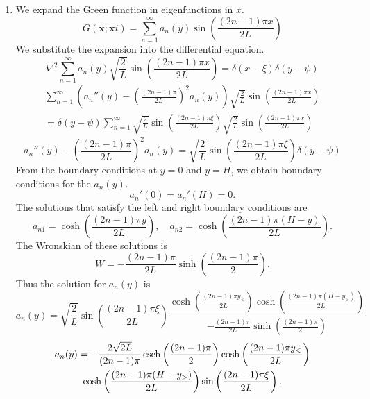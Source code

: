 {%
\begin{Solution}
  \begin{enumerate}
  \item
    We expand the Green function in eigenfunctions in $x$.
    \[
    G(\mathbf{x}; \mathbf{x}i) = \sum_{n = 1}^\infty a_n(y) 
    \sin \left( \frac{(2n-1)\pi x}{2 L} \right)
    \]
    We substitute the expansion into the differential equation.
    \[
    \nabla^2 \sum_{n = 1}^\infty a_n(y) 
    \sqrt{ \frac{2}{L} } \sin \left( \frac{(2n-1)\pi x}{2 L} \right) 
    = \delta(x - \xi) \delta(y - \psi)
    \]
    \begin{multline*}
      \sum_{n = 1}^\infty \left( a_n''(y) 
        - \left( \frac{(2n-1)\pi}{2 L} \right)^2 a_n(y) \right)
      \sqrt{ \frac{2}{L} } \sin \left( \frac{(2n-1)\pi x}{2 L} \right) 
      \\
      = \delta(y - \psi) \sum_{n = 1}^\infty 
      \sqrt{ \frac{2}{L} } \sin \left( \frac{(2n-1)\pi \xi}{2 L} \right) 
      \sqrt{ \frac{2}{L} } \sin \left( \frac{(2n-1)\pi x}{2 L}
      \right)
    \end{multline*}
    \[
    a_n''(y) - \left( \frac{(2n-1)\pi}{2 L} \right)^2 a_n(y) 
    = \sqrt{ \frac{2}{L} } \sin \left( \frac{(2n-1)\pi \xi}{2 L}
    \right) \delta(y - \psi)
    \]
    From the boundary conditions at $y = 0$ and $y = H$, we obtain 
    boundary conditions for the $a_n(y)$.
    \[
    a_n'(0) = a_n'(H) = 0.
    \]
    The solutions that satisfy the left and right boundary conditions are
    \[
    a_{n1} = \cosh \left( \frac{(2n-1)\pi y}{2 L} \right), \quad
    a_{n2} = \cosh \left( \frac{(2n-1)\pi (H-y)}{2 L} \right).
    \]
    The Wronskian of these solutions is
    \[
    W = - \frac{(2n-1) \pi}{2L} \sinh \left( \frac{(2n-1)\pi}{2} \right).
    \]
    Thus the solution for $a_n(y)$ is
    \[
    a_n(y) = \sqrt{ \frac{2}{L} } \sin \left( \frac{(2n-1)\pi \xi}{2 L} \right)
    \frac{ \cosh \left( \frac{(2n-1)\pi y_<}{2 L} \right) 
      \cosh \left( \frac{(2n-1)\pi (H-y_>)}{2 L} \right) }
    { - \frac{(2n-1) \pi}{2L} \sinh \left( \frac{(2n-1)\pi}{2}
      \right) }
    \]
    \begin{multline*}
      a_n(y) = - \frac{ 2 \sqrt{2 L} }{ (2n-1) \pi } 
      \mathop{\mathrm{csch}}\nolimits \left( \frac{(2n-1)\pi}{2} \right)
      \cosh \left( \frac{(2n-1)\pi y_<}{2 L} \right) 
      \\
      \cosh \left( \frac{(2n-1)\pi (H-y_>)}{2 L} \right)
      \sin \left( \frac{(2n-1)\pi \xi}{2 L} \right).
    \end{multline*}

\end{enumerate}
\end{Solution}}
